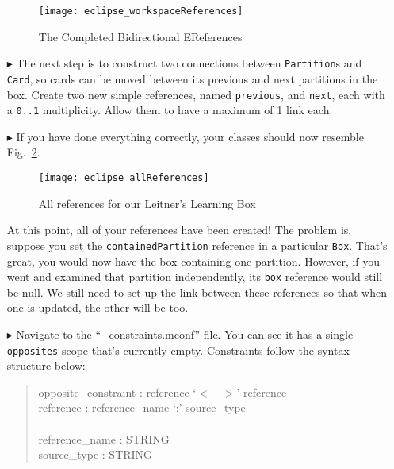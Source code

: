 \begin{itemize}
\vspace{0.5cm}

\begin{figure}[htbp]
	\centering
  \texttt{[image: eclipse\_workspaceReferences]}
	\caption{The Completed Bidirectional EReferences}
	\label{fig:almostAllReferences}
\end{figure} 

\item[$\blacktriangleright$] The next step is to construct two connections between \texttt{Partition}s and \texttt{Card}, so cards can be moved between its
previous and next partitions in the box. Create two new simple references, named \texttt{previous}, and \texttt{next}, each with a \texttt{0..1} multiplicity.
Allow them to have a maximum of 1 link each.

\vspace{0.5cm}

\item[$\blacktriangleright$] If you have done everything correctly, your classes should now resemble Fig.~\ref{fig:allReferences}. 

\vspace{0.5cm}

\begin{figure}[htbp]
	\centering
  \texttt{[image: eclipse\_allReferences]}
	\caption{All references for our Leitner's Learning Box}
	\label{fig:allReferences}
\end{figure} 

\clearpage

At this point, all of your references have been created! The problem is, suppose you set the \texttt{containedPartition} reference in a particular \texttt{Box}.
That's great, you would now have the box containing one partition. However, if you went and examined that partition independently, its \texttt{box} reference
would still be null. We still need to set up the link between these references so that when one is updated, the other will be too.

\vspace{0.5cm}

\item[$\blacktriangleright$] Navigate to the ``\_constraints.mconf'' file. You can see it has a single \texttt{opposites} scope that's currently empty.
Constraints follow the syntax structure below: 
{ \begin{quote} \small
	opposite\_constraint : reference `$<$ - $>$' reference \\
	reference : reference\_name `:' source\_type \\
	\\
	reference\_name : STRING \\
	source\_type : STRING \\
\end{quote} }


\end{itemize}
